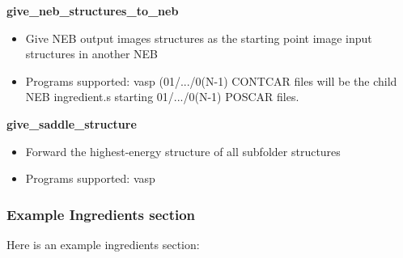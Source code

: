 \documentclass[letterpaper,10pt,english]{sphinxmanual}
\begin{document}
\textbf{give\_neb\_structures\_to\_neb}
\begin{itemize}
\item {} 
Give NEB output images structures as the starting point image input structures in another NEB

\item {} 
Programs supported: vasp (01/.../0(N-1) CONTCAR files will be the child NEB ingredient.s starting 01/.../0(N-1) POSCAR files.

\end{itemize}

\textbf{give\_saddle\_structure}
\begin{itemize}
\item {} 
Forward the highest-energy structure of all subfolder structures

\item {} 
Programs supported: vasp

\end{itemize}


\subsubsection{Example Ingredients section}
\label{3_1_2_ingredients:example-ingredients-section}
Here is an example ingredients section:
\end{document}
